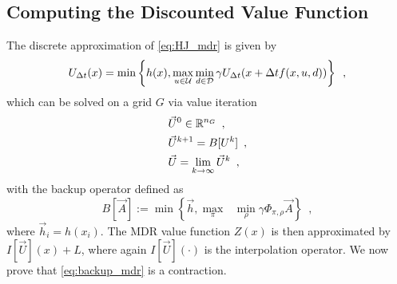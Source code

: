 %
%






\subsection{Computing the Discounted Value Function}
The discrete approximation of \eqref{eq:HJ_mdr} is given by
%
\begin{equation}\label{eq:U_approx}
    U_{\Delta t} (x) = \min\left\{h(x), \max_{u\in\mathcal{U}} \min_{ d\in\mathcal{D}}  \gamma U_{\Delta t}(x+\Delta tf(x,u,d))\right\} \enspace,
\end{equation}%
\noindent which can be solved on a grid $G$ via value iteration 
%
\begin{subequations} \label{eq:val_iter_backup}
\begin{align}
&\vec{U}^{0} \in \mathbb{R}^{n_G} \enspace,\\
&\vec{U}^{k+1} = B[U^k] \enspace,\\
&\vec{U} = \lim_{k\rightarrow \infty} \vec{U}^{k} \enspace,
\end{align}
\end{subequations}%
\noindent with the backup operator defined as
%
\begin{equation} \label{eq:backup_mdr}
B[\vec{A}] := \min\left\{ \vec{h}, \underset{\pi}{\max}\text{ }\underset{ \rho}{\min} \gamma \Phi_{\pi, \rho} \vec{A} \right \}
\enspace,
\end{equation}%
\noindent where $\vec{h}_i = h(x_i)$. The MDR value function $Z(x)$ is then approximated by $I[\vec{U}](x)+L$, where again $I[\vec{U}](\cdot)$ is the interpolation operator. We now prove that \eqref{eq:backup_mdr} is a contraction.

